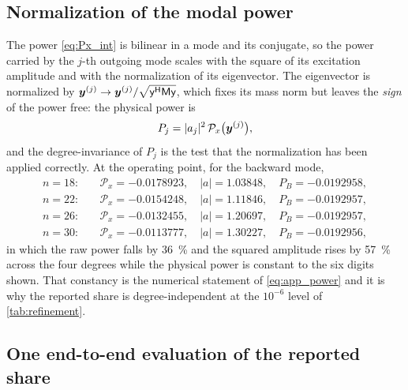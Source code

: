 \subsection{Normalization of the modal power}

The power \eqref{eq:Px_int} is bilinear in a mode and its conjugate, so the power
carried by the $j$-th outgoing mode scales with the square of its excitation
amplitude and with the normalization of its eigenvector.  The eigenvector is
normalized by $\boldsymbol{y}^{(j)}\to\boldsymbol{y}^{(j)}/\sqrt{\mathsf y^{\mathsf H}\mathsf
M\mathsf y}$, which fixes its mass norm but leaves the \emph{sign} of the power free:
the physical power is
\begin{equation}
\label{eq:app_power}
P_j=|a_j|^{2}\,\mathcal{P}_x\bigl(\boldsymbol{y}^{(j)}\bigr),
\end{equation}
and the degree-invariance of $P_j$ is the test that the normalization has been
applied correctly.  At the operating point, for the backward mode,
\begin{equation}
\label{eq:app_power_numbers}
\begin{aligned}
n=18:&\quad \mathcal{P}_x=-0.0178923,\quad |a|=1.03848,\quad P_B=-0.0192958,\\
n=22:&\quad \mathcal{P}_x=-0.0154248,\quad |a|=1.11846,\quad P_B=-0.0192957,\\
n=26:&\quad \mathcal{P}_x=-0.0132455,\quad |a|=1.20697,\quad P_B=-0.0192957,\\
n=30:&\quad \mathcal{P}_x=-0.0113777,\quad |a|=1.30227,\quad P_B=-0.0192956,
\end{aligned}
\end{equation}
in which the raw power falls by \SI{36}{\percent} and the squared amplitude rises by
\SI{57}{\percent} across the four degrees while the physical power is constant to
the six digits shown.  That constancy is the
numerical statement of \eqref{eq:app_power} and it is why the reported
share is degree-independent at the $10^{-6}$ level of
\cref{tab:refinement}.

\subsection{One end-to-end evaluation of the reported share}

